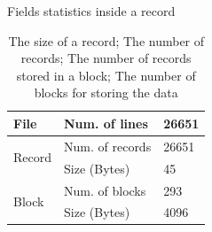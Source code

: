 \begin{table}[ht]
    \begin{minipage}{.55\textwidth}
        \renewcommand{\arraystretch}{1.2}
        \vspace{2mm}
        \caption{Fields statistics inside a record}
        \label{tab:field-stats}
    \end{minipage}
    \hfill
    \begin{minipage}{.4\textwidth}
        \centering
        \renewcommand{\arraystretch}{1.2}
        \begin{tabular}{@{}lll@{}}
        \toprule
        File                   & Num. of lines   & 26651 \\
        \midrule
        \multirow{2}{*}{Record}& Num. of records & 26651 \\
                               & Size (Bytes)    & 45    \\
        \midrule
        \multirow{2}{*}{Block} & Num. of blocks  & 293   \\
                               & Size (Bytes)    & 4096  \\
        \bottomrule
        \end{tabular}
        \vspace{5mm}
        \caption{The size of a record; The number of
records; The number of records stored in a block; The number of blocks
for storing the data}
    \end{minipage}
\end{table}

